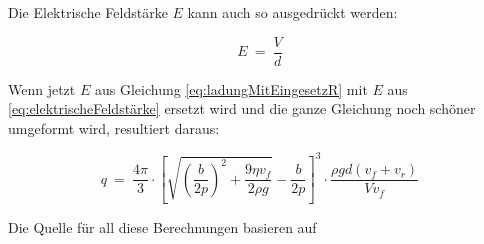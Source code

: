\noindent Die Elektrische Feldstärke $E$ kann auch so ausgedrückt werden:

\begin{equation}\label{eq:elektrischeFeldstärke}
	E \ = \ \frac{V}{d}
\end{equation}

\noindent Wenn jetzt $E$ aus Gleichung \ref{eq:ladungMitEingesetzR} mit $E$ aus \autoref{eq:elektrischeFeldstärke} ersetzt wird und die ganze Gleichung noch schöner umgeformt wird, resultiert daraus:

\begin{equation}\label{eq:letzteFormel}
	q \ = \ \frac{4\pi}{3} \cdot \left[ \sqrt{\left( \frac{b}{2p}\right)^2 + \frac{9\eta v_f}{2\rho g}} - \frac{b}{2p} \right]^3 \cdot \frac{\rho gd(v_f + v_r)}{Vv_f}
\end{equation}

\noindent Die Quelle für all diese Berechnungen basieren auf \parencite{instructionManual}




	

